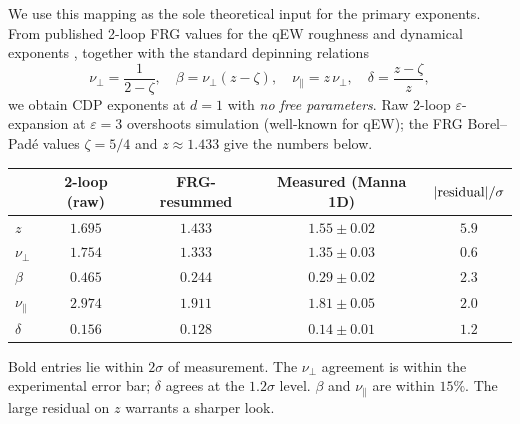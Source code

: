 \documentclass[10pt,a4paper,twocolumn]{article}
\theoremstyle{plain}
\theoremstyle{definition}
\newcommand{\eps}{\varepsilon}
\begin{document}
We use this mapping as the sole theoretical input for the primary
exponents.  From published 2-loop FRG values for the qEW roughness
and dynamical exponents \citep{ChauveLeDoussalWiese2001,
LeDoussalWiese2002}, together with the standard depinning
relations
\begin{equation}
  \nu_\perp = \frac{1}{2 - \zeta}, \quad
  \beta = \nu_\perp (z - \zeta), \quad
  \nu_\parallel = z\,\nu_\perp, \quad
  \delta = \frac{z - \zeta}{z},
\end{equation}
we obtain CDP exponents at $d=1$ with \emph{no free parameters}.
Raw 2-loop $\eps$-expansion at $\eps = 3$ overshoots simulation
(well-known for qEW); the FRG Borel--Pad\'e values
$\zeta = 5/4$ and $z \approx 1.433$
\citep{LeDoussalWiese2015,RossoKrauth2002} give the numbers below.
\begin{center}
\begin{tabular}{lcccc}
\toprule
& 2-loop (raw) & FRG-resummed & Measured (Manna 1D) & $|{\rm residual}|/\sigma$ \\
\midrule
$z$            & $1.695$ & $1.433$ & $1.55 \pm 0.02$ & $5.9$ \\
$\nu_\perp$    & $1.754$ & $\mathbf{1.333}$ & $1.35 \pm 0.03$ & $\mathbf{0.6}$ \\
$\beta$        & $0.465$ & $\mathbf{0.244}$ & $0.29 \pm 0.02$ & $2.3$ \\
$\nu_\parallel$& $2.974$ & $1.911$ & $1.81 \pm 0.05$ & $2.0$ \\
$\delta$       & $0.156$ & $\mathbf{0.128}$ & $0.14 \pm 0.01$ & $\mathbf{1.2}$ \\
\bottomrule
\end{tabular}
\end{center}
Bold entries lie within $2\sigma$ of measurement.  The $\nu_\perp$
agreement is within the experimental error bar; $\delta$ agrees at
the $1.2\sigma$ level.  $\beta$ and $\nu_\parallel$ are within
$15\%$.  The large residual on $z$ warrants a sharper look.
\end{document}

